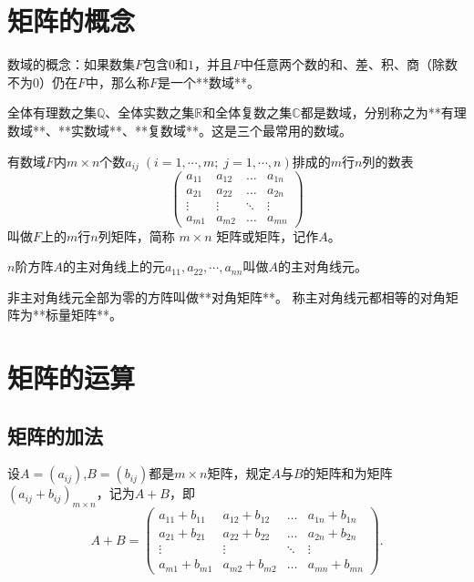 \section{矩阵的概念}

数域的概念：如果数集$F$包含$0$和$1$，并且$F$中任意两个数的和、差、积、商（除数不为$0$）仍在$F$中，那么称$F$是一个**数域**。

全体有理数之集$\mathbb{Q}$、全体实数之集$\mathbb{R}$和全体复数之集$\mathbb{C}$都是数域，分别称之为**有理数域**、**实数域**、**复数域**。这是三个最常用的数域。

\begin{definition}
有数域$F$内$m\times n$个数$a_{ij}\;(i = 1, \cdots , m;\; j = 1, \cdots , n)$排成的$m$行$n$列的数表
\[
\begin{pmatrix}
a_{11}&a_{12}&\dots&a_{1n}\\
a_{21}&a_{22}&\dots&a_{2n}\\
\vdots&\vdots&\ddots&\vdots \\
a_{m1}&a_{m2}&\dots&a_{mn}
\end{pmatrix}
\]
叫做$F$上的$m$行$n$列矩阵，简称 $m\times n$ 矩阵或矩阵，记作$A$。
\end{definition}

$n$阶方阵$A$的主对角线上的元$a_{11},a_{22},\cdots,a_{nn}$叫做$A$的主对角线元。

非主对角线元全部为零的方阵叫做**对角矩阵**。
称主对角线元都相等的对角矩阵为**标量矩阵**。


\section{矩阵的运算}

\subsection{矩阵的加法}
\begin{definition}
设$A = (a_{ij})$,$B = (b_{ij})$都是$m\times n$矩阵，规定$A$与$B$的矩阵和为矩阵$(a_{ij}+b_{ij})_{m\times n}$，记为$A+B$，即
\[
A+B=
\begin{pmatrix}
a_{11}+b_{11}&a_{12}+b_{12}&\dots&a_{1n}+b_{1n}\\
a_{21}+b_{21}&a_{22}+b_{22}&\dots&a_{2n}+b_{2n}\\
\vdots&\vdots&\ddots&\vdots \\
a_{m1}+b_{m1}&a_{m2}+b_{m2}&\dots&a_{mn}+b_{mn}
\end{pmatrix}.
\]
\end{definition}

